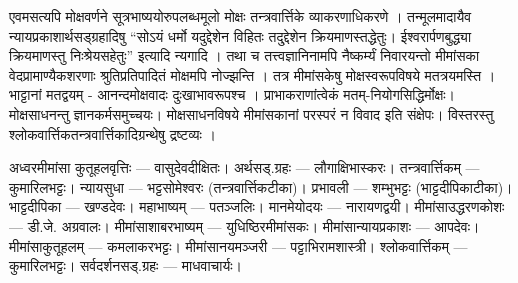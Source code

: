 
एवमसत्यपि मोक्षवर्णने सूत्रभाष्ययोरुपलब्धमूलो मोक्षः तन्त्रवार्त्तिके व्याकरणाधिकरणे । तन्मूलमादायैव न्यायप्रकाशार्थसड्ग्रहादिषु “सोऽयं धर्मो यदुद्देशेन विहितः तदु्द्देशेन क्रियमाणस्तद्धेतुः। ईश्वरार्पणबुद्ध्या क्रियमाणस्तु निःश्रेयसहेतुः” इत्यादि न्यगादि । तथा च तत्त्वज्ञानिनामपि नैष्कर्म्यं निवारयन्तो मीमांसका वेदप्रामाण्यैकशरणाः श्रुतिप्रतिपादितं मोक्षमपि नोज्झन्ति । तत्र मीमांसकेषु मोक्षस्वरूपविषये मतत्रयमस्ति । भाट्टानां मतद्वयम् - आनन्दमोक्षवादः दुःखाभावरूपश्च । प्राभाकराणांत्वेकं मतम्-नियोगसिद्धिर्मोक्षः। मोक्षसाधनन्तु ज्ञानकर्मसमुच्चयः। मोक्षसाधनविषये मीमांसकानां परस्परं न विवाद इति संक्षेपः। विस्तरस्तु श्लोकवार्त्तिकतन्त्रवार्त्तिकादिग्रन्थेषु द्रष्टव्यः ।
 
\begin{thebibliography}{99}
 अध्वरमीमांसा कुतूहलवृत्तिः --- वासुदेवदीक्षितः।
 अर्थसड्.ग्रहः --- लौगाक्षिभास्करः।
 तन्त्रवार्त्तिकम् --- कुमारिलभट्टः।
 न्यायसुधा --- भट्टसोमेश्वरः (तन्त्रवार्त्तिकटीका)।
 प्रभावली --- शम्भुभट्टः (भाट्टदीपिकाटीका)।
 भाट्टदीपिका --- खण्डदेवः।
 महाभाष्यम् --- पतञ्जलिः।
 मानमेयोदयः --- नारायणद्वयी।
 मीमांसाउद्धरणकोशः --- डी.जे. अग्रवालः।
 मीमांसाशाबरभाष्यम् --- युधिष्ठिरमीमांसकः।
 मीमांसान्यायप्रकाशः --- आपदेवः।
 मीमांसाकुतूहलम् --- कमलाकरभट्टः।
 मीमांसानयमञ्जरी --- पट्टाभिरामशास्त्री।
 श्लोकवार्त्तिकम् --- कुमारिलभट्टः।
 सर्वदर्शनसड्.ग्रहः --- माधवाचार्यः।
\end{thebibliography}

